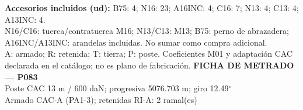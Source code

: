 \begingroup\scriptsize
\textbf{Accesorios incluidos (ud):} B75: 4; N16: 23; A16INC: 4; C16: 7; N13: 4; C13: 4; A13INC: 4.\\
N16/C16: tuerca/contratuerca M16; N13/C13: M13; B75: perno de abrazadera; A16INC/A13INC: arandelas incluidas. No sumar como compra adicional.\\
A: armado; R: retenida; T: tierra; P: poste. Coeficientes M01 y adaptación CAC declarada en el catálogo; no es plano de fabricación.
\endgroup\endgroup
\clearpage{}
\begingroup\small\setlength{\parskip}{3pt}\renewcommand{\arraystretch}{1.05}
\textbf{\large FICHA DE METRADO — P083}\\[4pt]
Poste CAC 13 m / 600 daN; progresiva 5076.703 m; giro 12.49\ensuremath{^\circ}\\
Armado CAC-A (PA1-3); retenidas RI-A: 2 ramal(es)\\
\begingroup\scriptsize
